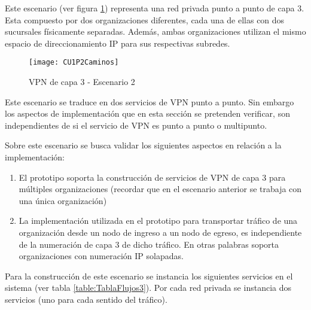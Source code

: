 Este escenario (ver figura \ref{fig:CUP2}) representa una red privada punto a punto de capa 3. Esta compuesto por dos organizaciones diferentes, cada una de ellas con dos sucursales f\'isicamente separadas. Adem\'as, ambas organizaciones utilizan el mismo espacio de direccionamiento IP para sus respectivas subredes.\\

\begin{figure}[h!] 
\centering    
\texttt{[image: CU1P2Caminos]}
\caption[VPN de capa 3 - Escenario 2]{VPN de capa 3 - Escenario 2}
\label{fig:CUP2}
\end{figure}


Este escenario se traduce en dos servicios de VPN punto a punto. Sin embargo los aspectos de implementaci\'on que en esta secci\'on se pretenden verificar, son independientes de si el servicio de VPN es punto a punto o multipunto.

Sobre este escenario se busca validar los siguientes aspectos en relaci\'on a la implementaci\'on:

\begin{enumerate}
\item El prototipo soporta la construcci\'on de servicios de VPN de capa 3 para múltiples organizaciones (recordar que en el escenario anterior se trabaja con una \'unica organización)
\item La implementaci\'on utilizada en el prototipo para transportar tr\'afico de una organización desde un nodo de ingreso a un nodo de egreso, es independiente de la numeraci\'on de capa 3 de dicho tr\'afico. En otras palabras soporta organizaciones con numeraci\'on IP solapadas.
\end{enumerate}

Para la construcci\'on de este escenario se instancia los siguientes servicios en el sistema (ver tabla \ref{table:TablaFlujos3}). Por cada red privada se instancia dos servicios (uno para cada sentido del tr\'afico).

